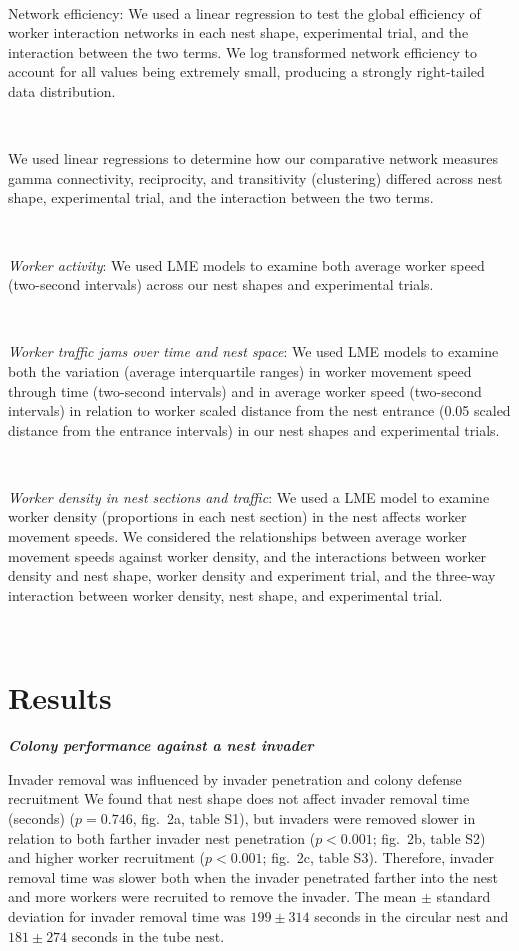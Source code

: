 \documentclass[3p]{elsarticle} %
\begin{document}
~

Network efficiency: We used a linear regression to test the global
efficiency of worker interaction networks in each nest shape,
experimental trial, and the interaction between the two terms. We log
transformed network efficiency to account for all values being extremely
small, producing a strongly right-tailed data distribution.

~

We used linear regressions to determine how our comparative network
measures gamma connectivity, reciprocity, and transitivity (clustering)
differed across nest shape, experimental trial, and the interaction
between the two terms.

~

\emph{Worker activity}: We used LME models to examine both average
worker speed (two-second intervals) across our nest shapes and
experimental trials.

~

\emph{Worker traffic jams over time and nest space}: We used LME models
to examine both the variation (average interquartile ranges) in worker
movement speed through time (two-second intervals) and in average worker
speed (two-second intervals) in relation to worker scaled distance from
the nest entrance (0.05 scaled distance from the entrance intervals) in
our nest shapes and experimental trials.

~

\emph{Worker density in nest sections and traffic}: We used a LME model
to examine worker density (proportions in each nest section) in the nest
affects worker movement speeds. We considered the relationships between
average worker movement speeds against worker density, and the
interactions between worker density and nest shape, worker density and
experiment trial, and the three-way interaction between worker density,
nest shape, and experimental trial.

~

\hypertarget{results}{%
\section{Results}\label{results}}

\textbf{\emph{Colony performance against a nest invader}}

Invader removal was influenced by invader penetration and colony defense
recruitment We found that nest shape does not affect invader removal
time (seconds) (\(p = 0.746\), fig.~2a, table S1), but invaders were
removed slower in relation to both farther invader nest penetration
(\(p < 0.001\); fig.~2b, table S2) and higher worker recruitment
(\(p < 0.001\); fig.~2c, table S3). Therefore, invader removal time was
slower both when the invader penetrated farther into the nest and more
workers were recruited to remove the invader. The mean \(\pm\) standard
deviation for invader removal time was \(199\pm314\) seconds in the
circular nest and \(181\pm274\) seconds in the tube nest.
\end{document}
